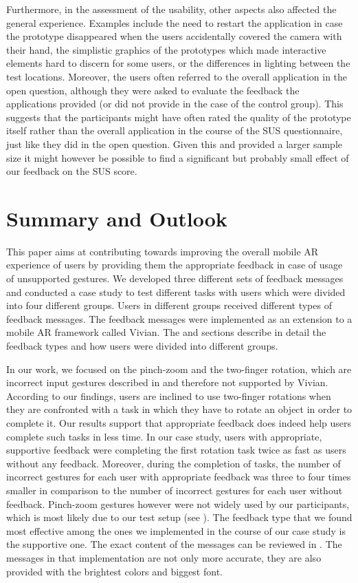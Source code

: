 \documentclass[manuscript]{acmart}
\begin{document}
			Furthermore, in the assessment of the usability, other aspects also affected the general experience. Examples include the need to restart the application in case the prototype disappeared when the users accidentally covered the camera with their hand, the simplistic graphics of the prototypes which made interactive elements hard to discern for some users, or the differences in lighting between the test locations. Moreover, the users often referred to the overall application in the open question, although they were asked to evaluate the feedback the applications provided (or did not provide in the case of the control group). This suggests that the participants might have often rated the quality of the prototype itself rather than the overall application in the course of the SUS questionnaire, just like they did in the open question. Given this and provided a larger sample size it might however be possible to find a significant but probably small effect of our feedback on the SUS score.

	\section{Summary and Outlook}\label{sec:summary}
		This paper aims at contributing towards improving the overall mobile \ac{AR} experience of users by providing them the appropriate feedback in case of usage of unsupported gestures. We developed three different sets of feedback messages and conducted a case study to test different tasks with users which were divided into four different groups. Users in different groups received different types of feedback messages. The feedback messages were implemented as an extension to a mobile \ac{AR} framework called Vivian. The \emph{} and \emph{} sections describe in detail the feedback types and how users were divided into different groups.
		
		In our work, we focused on the pinch-zoom and the two-finger rotation, which are incorrect input gestures described in  and therefore not supported by Vivian. According to our findings, users are inclined to use two-finger rotations when they are confronted with a task in which they have to rotate an object in order to complete it. Our results support that appropriate feedback does indeed help users complete such tasks in less time. In our case study, users with appropriate, supportive feedback were completing the first rotation task twice as fast as users without any feedback. Moreover, during the completion of tasks, the number of incorrect gestures for each user with appropriate feedback was three to four times smaller in comparison to the number of incorrect gestures for each user without feedback. Pinch-zoom gestures however were not widely used by our participants, which is most likely due to our test setup (see ). The feedback type that we found most effective among the ones we implemented in the course of our case study is the supportive one. The exact content of the messages can be reviewed in . The messages in that implementation are not only more accurate, they are also provided with the brightest colors and biggest font.
\end{document}
